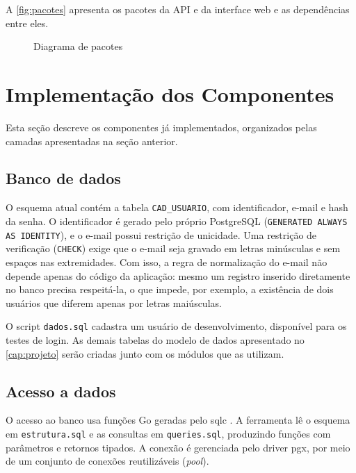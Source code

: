 A \autoref{fig:pacotes} apresenta os pacotes da API e da interface web e as dependências entre eles.

\begin{figure}[htbp]
  \centering
  \caption{Diagrama de pacotes}
  \label{fig:pacotes}
  \resizebox{\linewidth}{!}{}
\end{figure}

\section{Implementação dos Componentes}
\label{sec:componentes}

Esta seção descreve os componentes já implementados, organizados pelas camadas apresentadas na seção anterior.

\subsection{Banco de dados}

O esquema atual contém a tabela \texttt{CAD\_USUARIO}, com identificador, e-mail e hash da senha. O identificador é gerado pelo próprio PostgreSQL (\texttt{GENERATED ALWAYS AS IDENTITY}), e o e-mail possui restrição de unicidade. Uma restrição de verificação (\texttt{CHECK}) exige que o e-mail seja gravado em letras minúsculas e sem espaços nas extremidades. Com isso, a regra de normalização do e-mail não depende apenas do código da aplicação: mesmo um registro inserido diretamente no banco precisa respeitá-la, o que impede, por exemplo, a existência de dois usuários que diferem apenas por letras maiúsculas.

O script \texttt{dados.sql} cadastra um usuário de desenvolvimento, disponível para os testes de login. As demais tabelas do modelo de dados apresentado no \autoref{cap:projeto} serão criadas junto com os módulos que as utilizam.

\subsection{Acesso a dados}

O acesso ao banco usa funções Go geradas pelo sqlc \cite{sqlc}. A ferramenta lê o esquema em \texttt{estrutura.sql} e as consultas em \texttt{queries.sql}, produzindo funções com parâmetros e retornos tipados. A conexão é gerenciada pelo driver pgx, por meio de um conjunto de conexões reutilizáveis (\textit{pool}).

